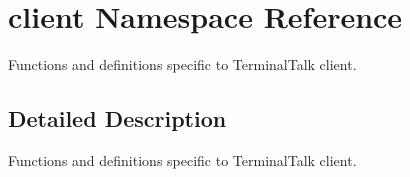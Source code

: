 \hypertarget{namespaceclient}{}\section{client Namespace Reference}
\label{namespaceclient}


Functions and definitions specific to Terminal\+Talk client.  




\subsection{Detailed Description}
Functions and definitions specific to Terminal\+Talk client. 